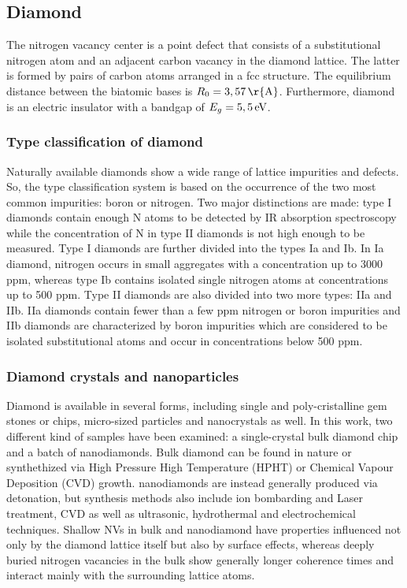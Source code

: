 \documentclass[12pt,a4paper]{article}
\begin{document}
\subsection{Diamond}
The nitrogen vacancy center is a point defect that consists of a substitutional nitrogen atom and an adjacent carbon vacancy in the diamond lattice. The latter is formed by pairs of carbon atoms arranged in a fcc structure. The equilibrium distance between the biatomic bases is $R_0=\unit[3,57]{\r{A}}$. Furthermore, diamond is an electric insulator with a bandgap of $E_g=\unit[5,5]{eV}$\cite{gmf}.
\subsubsection{Type classification of diamond}
Naturally available diamonds show a wide range of lattice impurities and defects. So, the type classification system is based on the occurrence of the two most common impurities: boron or nitrogen. Two major distinctions are made: type I diamonds contain enough N atoms to be detected by IR absorption spectroscopy while the concentration of N in type II diamonds is not high enough to be measured\cite{pod}. Type I diamonds are further divided into the types Ia and Ib. In Ia diamond, nitrogen occurs in small aggregates with a concentration up to 3000 ppm, whereas type Ib contains isolated single nitrogen atoms at concentrations up to 500 ppm\cite{mspd}. 
Type II diamonds are also divided into two more types: IIa and IIb. IIa diamonds contain fewer than a few ppm nitrogen or boron impurities and IIb diamonds are characterized by boron impurities which are considered to be isolated substitutional atoms and occur in concentrations below 500 ppm\cite{pod}\cite{cod}\cite{darm}\cite{opdadh}.
\subsubsection{Diamond crystals and nanoparticles}
Diamond is available in several forms, including single  and poly-cristalline gem stones or chips, micro-sized particles and nanocrystals as well. In this work, two different kind of samples have been examined: a single-crystal bulk diamond chip and a  batch of nanodiamonds. Bulk diamond can be found in nature or synthethized via High Pressure High Temperature (HPHT) or Chemical Vapour Deposition (CVD) growth\cite{dgcvd}\cite{hpht}. nanodiamonds are instead generally produced via detonation, but synthesis methods also include ion bombarding and Laser treatment, CVD as well as ultrasonic, hydrothermal and electrochemical techniques\cite{st}\cite{nd}. Shallow NVs in bulk and nanodiamond  have properties influenced not only by the diamond lattice itself but also by surface effects, whereas deeply buried nitrogen vacancies in the bulk show generally longer coherence times and interact mainly with the surrounding lattice atoms.
\end{document}
